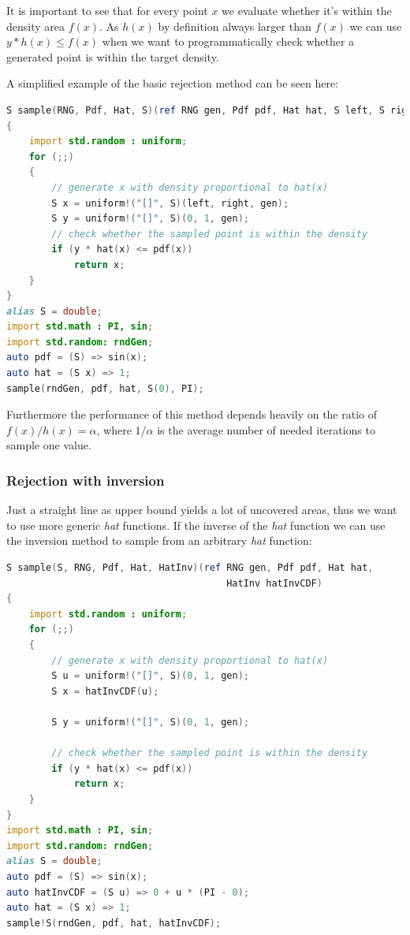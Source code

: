 \documentclass[]{article}
\begin{document}
It is important to see that for every point $x$ we evaluate whether it's within the density area $f(x)$. As $h(x)$ by definition always larger than $f(x)$ we can use $y * h(x) \leq f(x)$ when we want to programmatically check whether a generated point is within the target density.

A simplified example of the basic rejection method can be seen here:

\begin{minipage}{\linewidth}
\begin{lstlisting}[language=D]
S sample(RNG, Pdf, Hat, S)(ref RNG gen, Pdf pdf, Hat hat, S left, S right)
{
    import std.random : uniform;
    for (;;)
    {
        // generate x with density proportional to hat(x)
        S x = uniform!("[]", S)(left, right, gen);
        S y = uniform!("[]", S)(0, 1, gen);
        // check whether the sampled point is within the density
        if (y * hat(x) <= pdf(x))
            return x;
    }
}
alias S = double;
import std.math : PI, sin;
import std.random: rndGen;
auto pdf = (S) => sin(x);
auto hat = (S x) => 1;
sample(rndGen, pdf, hat, S(0), PI);
\end{lstlisting}
\end{minipage}

Furthermore the performance of this method depends heavily on the ratio of $f(x) / h(x) = \alpha$, where $1 / \alpha$ is the average number of needed iterations to sample one value.

\subsubsection{Rejection with inversion}

Just a straight line as upper bound yields a lot of uncovered areas, thus we want to use more generic \textit{hat} functions. If the inverse of the \textit{hat} function we can use the inversion method to sample from an arbitrary \textit{hat} function:

\begin{minipage}{0.9\linewidth}
\begin{lstlisting}[language=D]
S sample(S, RNG, Pdf, Hat, HatInv)(ref RNG gen, Pdf pdf, Hat hat,
                                       HatInv hatInvCDF)
{
    import std.random : uniform;
    for (;;)
    {
        // generate x with density proportional to hat(x)
        S u = uniform!("[]", S)(0, 1, gen);
        S x = hatInvCDF(u);

        S y = uniform!("[]", S)(0, 1, gen);

        // check whether the sampled point is within the density
        if (y * hat(x) <= pdf(x))
            return x;
    }
}
import std.math : PI, sin;
import std.random: rndGen;
alias S = double;
auto pdf = (S) => sin(x);
auto hatInvCDF = (S u) => 0 + u * (PI - 0);
auto hat = (S x) => 1;
sample!S(rndGen, pdf, hat, hatInvCDF);
\end{lstlisting}
\end{minipage}
\end{document}
